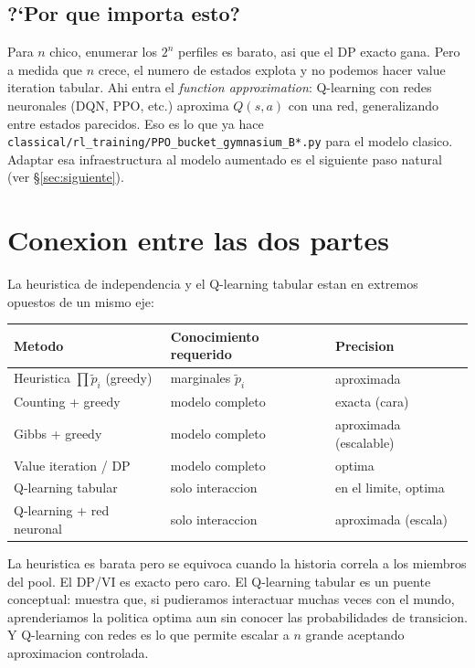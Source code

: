 \documentclass[11pt]{article}
\begin{document}
\subsection{?`Por que importa esto?}

Para $n$ chico, enumerar los $2^n$ perfiles es barato, asi que el DP
exacto gana. Pero a medida que $n$ crece, el numero de estados
explota y no podemos hacer value iteration tabular. Ahi entra el
\emph{function approximation}: Q-learning con redes neuronales (DQN,
PPO, etc.) aproxima $Q(s, a)$ con una red, generalizando entre
estados parecidos. Eso es lo que ya hace
\texttt{classical/rl\_training/PPO\_bucket\_gymnasium\_B*.py} para el
modelo clasico. Adaptar esa infraestructura al modelo aumentado es el
siguiente paso natural (ver \S\ref{sec:siguiente}).

\section{Conexion entre las dos partes}

La heuristica de independencia y el Q-learning tabular estan en
extremos opuestos de un mismo eje:

\begin{center}
\begin{tabular}{lll}
\toprule
Metodo & Conocimiento requerido & Precision \\
\midrule
Heuristica $\prod \tilde p_i$ (greedy) & marginales $\tilde p_i$ & aproximada \\
Counting + greedy & modelo completo & exacta (cara) \\
Gibbs + greedy & modelo completo & aproximada (escalable) \\
Value iteration / DP & modelo completo & optima \\
Q-learning tabular & solo interaccion & en el limite, optima \\
Q-learning + red neuronal & solo interaccion & aproximada (escala) \\
\bottomrule
\end{tabular}
\end{center}

La heuristica es barata pero se equivoca cuando la historia correla a
los miembros del pool. El DP/VI es exacto pero caro. El Q-learning
tabular es un puente conceptual: muestra que, si pudieramos interactuar
muchas veces con el mundo, aprenderiamos la politica optima aun sin
conocer las probabilidades de transicion. Y Q-learning con redes es lo
que permite escalar a $n$ grande aceptando aproximacion controlada.
\end{document}
